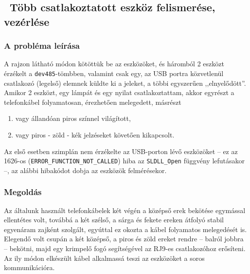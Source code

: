 \documentclass[tocnopagenum]{thesis-ekf}
\begin{document}
	\subsection{\ Több csatlakoztatott eszköz felismerése, vezérlése}
	\subsubsection{A probléma leírása}
	A rajzon látható módon kötöttük be az eszközöket, és háromból 2 eszközt érzékelt a \verb*|dev485|-tömbben, valamint csak egy, az USB portra közvetlenül csatlakozó (legelső) elemnek küldte ki a jeleket, a többi egyszerűen ,,elnyelődött''.
	Amikor 2 eszközt, egy lámpát és egy nyilat csatlakoztattam, akkor egyrészt a telefonkábel folyamatosan, érezhetően melegedett, másrészt 
	\renewcommand{\labelenumi}{\alph{enumi})}
	\begin{enumerate}
		\item vagy állandóan piros színnel világított, 
		\item vagy piros - zöld - kék jelzéseket követően kikapcsolt.
	\end{enumerate}
	Az első esetben szimplán nem érzékelte az USB-porton lévő eszközöket -- ez az 1626-os (\verb*|ERROR_FUNCTION_NOT_CALLED|) hiba az \verb*|SLDLL_Open| függvény lefutásakor --, az alábbi hibakódot dobja az eszközök felmérésekor.
	\subsubsection{Megoldás} Az általunk használt telefonkábelek két végén a középső erek bekötése egymással ellentétes volt, továbbá a két szélső, a sárga és fekete ereken átfolyó stabil egyenáram zajként szolgált, egyúttal ez okozta a kábel folyamatos melegedését is. Elegendő volt csupán a két középső, a piros és zöld ereket rendre -- balról jobbra --  bekötni, majd egy krimpelő fogó segítségével az RJ9-es csatlakozóhoz erősíteni. Az ily módon elkészült kábel alkalmassá teszi az eszközöket a soros kommunikációra.
\end{document}
